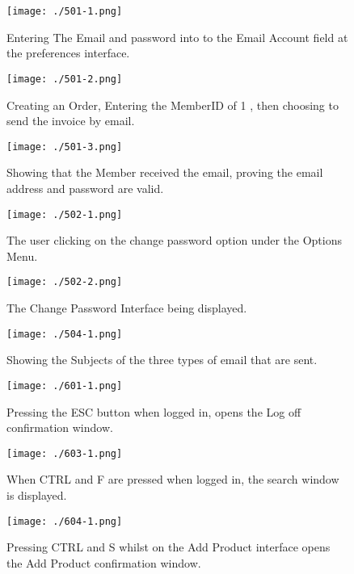 \begin{figure}[H]
    \texttt{[image: ./501-1.png]}
    \caption{Entering The Email and password into to the Email Account field at the preferences interface.} \label{fig:501-1}
\end{figure}

\begin{figure}[H]
    \texttt{[image: ./501-2.png]}
    \caption{Creating an Order, Entering the MemberID of 1 , then choosing to send the invoice by email.} \label{fig:501-2}
\end{figure}

\begin{figure}[H]
    \texttt{[image: ./501-3.png]}
    \caption{Showing that the Member received the email, proving the email address and password are valid.} \label{fig:501-3}
\end{figure}

\begin{figure}[H]
    \texttt{[image: ./502-1.png]}
    \caption{ The user clicking on the change password option under the Options Menu. } \label{fig:502-1}
\end{figure}

\begin{figure}[H]
    \texttt{[image: ./502-2.png]}
    \caption{The Change Password Interface being displayed.} \label{fig:502-2}
\end{figure}

\begin{figure}[H]
    \texttt{[image: ./504-1.png]}
    \caption{Showing the Subjects of the three types of email that are sent.} \label{fig:504-1}
\end{figure}

\begin{figure}[H]
    \texttt{[image: ./601-1.png]}
    \caption{Pressing the ESC button when logged in, opens the Log off confirmation window.} \label{fig:601-1}
\end{figure}

\begin{figure}[H]
    \texttt{[image: ./603-1.png]}
    \caption{When CTRL and F are pressed when logged in, the search window is displayed.} \label{fig:603-1}
\end{figure}

\begin{figure}[H]
    \texttt{[image: ./604-1.png]}
    \caption{Pressing CTRL and S whilst on the Add Product interface opens the Add Product confirmation window.} \label{fig:604-1}
\end{figure}

